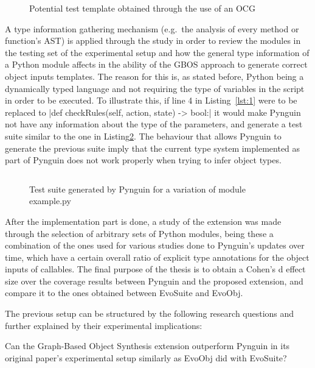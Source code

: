 \documentclass[%
  chapterprefix=false,%
  open=right,%
  twoside=true,%
  paper=a4,%
  logofile={Figures/logo.png},%
  thesistype=master,%
  UKenglish,%
]{se2thesis}
\begin{document}
\begin{figure}
  \inputminted[linenos]{python}{Figures/template.py}
  \caption{Potential test template obtained through the use of an OCG\label{lst:4}}
\end{figure}

A type information gathering mechanism (e.g.~the analysis of every method or function's AST) is applied through the study in order to review the modules in the testing set of the experimental setup and how the general type information of a Python module affects in the ability of the GBOS approach to generate correct object inputs templates.
The reason for this is, as stated before, Python being a dynamically typed language and not requiring the type of variables in the script in order to be executed.
To illustrate this, if line 4 in Listing~\ref{lst:1} were to be replaced to |def checkRules(self, action, state) -> bool:| it would make Pynguin not have any information about the type of the parameters, and generate a test suite similar to the one in Listing\ref{lst:5}.
The behaviour that allows Pynguin to generate the previous suite imply that the current type system implemented as part of Pynguin does not work properly when trying to infer object types.

\begin{figure}
  \inputminted[linenos]{python}{Figures/test2.py}
  \caption{Test suite generated by Pynguin for a variation of module example.py\label{lst:5}}
\end{figure}

After the implementation part is done, a study of the extension was made through the selection of arbitrary sets of Python modules, being these a combination of the ones used for various studies done to Pynguin's updates over time, which have a certain overall ratio of explicit type annotations for the object inputs of callables.
The final purpose of the thesis is to obtain a Cohen's d effect size over the coverage results between Pynguin and the proposed extension, and compare it to the ones obtained between EvoSuite and EvoObj.

The previous setup can be structured by the following research questions and further explained by their experimental implications:

\begin{resq}
  Can the Graph-Based Object Synthesis extension outperform Pynguin in its original paper's experimental setup similarly as EvoObj did with EvoSuite?
\end{resq}
\end{document}

